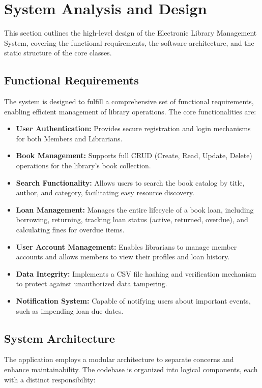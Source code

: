 \section{System Analysis and Design}
\label{sec:design}

This section outlines the high-level design of the Electronic Library Management System, covering the functional requirements, the software architecture, and the static structure of the core classes.

\subsection{Functional Requirements}
The system is designed to fulfill a comprehensive set of functional requirements, enabling efficient management of library operations. The core functionalities are:

\begin{itemize}
    \item \textbf{User Authentication:} Provides secure registration and login mechanisms for both Members and Librarians.
    \item \textbf{Book Management:} Supports full CRUD (Create, Read, Update, Delete) operations for the library's book collection.
    \item \textbf{Search Functionality:} Allows users to search the book catalog by title, author, and category, facilitating easy resource discovery.
    \item \textbf{Loan Management:} Manages the entire lifecycle of a book loan, including borrowing, returning, tracking loan status (active, returned, overdue), and calculating fines for overdue items.
    \item \textbf{User Account Management:} Enables librarians to manage member accounts and allows members to view their profiles and loan history.
    \item \textbf{Data Integrity:} Implements a CSV file hashing and verification mechanism to protect against unauthorized data tampering.
    \item \textbf{Notification System:} Capable of notifying users about important events, such as impending loan due dates.
\end{itemize}

\subsection{System Architecture}
The application employs a modular architecture to separate concerns and enhance maintainability\cite{Martin2017}. The codebase is organized into logical components, each with a distinct responsibility:


